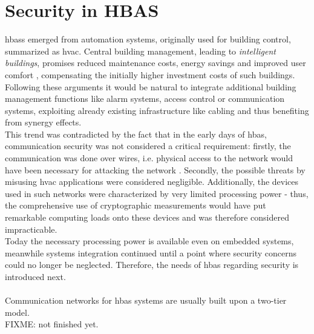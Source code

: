\section{Security in HBAS}\label{hbaSec}
\glspl{hbas} emerged from automation systems, originally used for building control, summarized as \gls{hvac}.
Central building management, leading to \textit{intelligent buildings}, promises
reduced maintenance costs, energy savings and improved user comfort \cite{1435745}, compensating the initially higher investment costs of such buildings.
Following these arguments it would be natural to integrate additional building management functions like alarm systems, access control or communication systems,
exploiting already existing infrastructure like cabling and thus benefiting from synergy effects.
\\
This trend was contradicted by the fact that in the early days of \gls{hbas}, communication security was not considered a critical requirement:
firstly, the communication was done over wires,
i.e. physical access to the network would have been necessary for attacking the network \cite{knxSpec}. Secondly, the possible threats by misusing \gls{hvac} applications
were considered negligible. Additionally, the devices used in such networks were characterized by very limited processing power - thus, the comprehensive
use of cryptographic measurements would have put remarkable computing loads onto these devices and was therefore considered impracticable.
\\
Today the necessary processing power is available even on embedded systems, meanwhile systems integration continued until a point where security concerns could
no longer be neglected. Therefore, the needs of \gls{hbas} regarding security is introduced next.
\\
\\
Communication networks for \gls{hbas} systems are usually built upon a two-tier model.
\\
FIXME: not finished yet.
